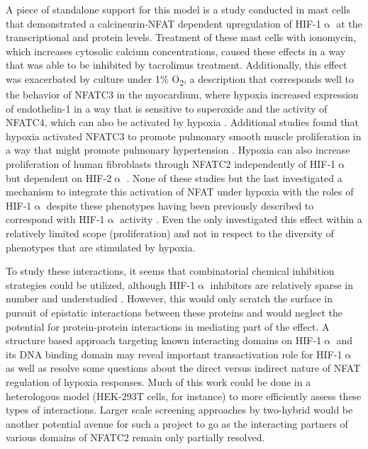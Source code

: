 A piece of standalone support for this model is a study conducted in mast cells that demonstrated a calcineurin-NFAT dependent upregulation of HIF-1$\upalpha$ at the transcriptional and protein levels. Treatment of these mast cells with ionomycin, which increases cytosolic calcium concentrations, caused these effects in a way that was able to be inhibited by tacrolimus treatment. Additionally, this effect was exacerbated by culture under 1\% O\textsubscript{2}, a description that corresponds well to the behavior of NFATC3 in the myocardium, where hypoxia increased expression of endothelin-1 in a way that is sensitive to superoxide and the activity of NFATC4, which can also be activated by hypoxia \citep{deFrutos2011, RamiroDiaz2014, Moreno2015}. Additional studies found that hypoxia activated NFATC3 to promote pulmonary smooth muscle proliferation in a way that might promote pulmonary hypertension \citep{Hou2013}. Hypoxia can also increase proliferation of human fibroblasts through NFATC2 independently of HIF-1$\upalpha$ but dependent on HIF-2$\upalpha$ \citep{Senavirathani2018}. None of these studies but the last investigated a mechanism to integrate this activation of NFAT under hypoxia with the roles of HIF-1$\upalpha$ despite these phenotypes having been previously described to correspond with HIF-1$\upalpha$ activity \citep{Cui2021, Qi2017, Li2014, Thackaberry2002, SonanezOrganis2016}. Even the \citeauthor{Senavirathani2018} only investigated this effect within a relatively limited scope (proliferation) and not in respect to the diversity of phenotypes that are stimulated by hypoxia.

To study these interactions, it seems that combinatorial chemical inhibition strategies could be utilized, although HIF-1$\upalpha$ inhibitors are relatively sparse in number and understudied \citep{Viziteu2016}. However, this would only scratch the surface in pursuit of epistatic interactions between these proteins and would neglect the potential for protein-protein interactions in mediating part of the effect. A structure based approach targeting known interacting domains on HIF-1$\upalpha$ and its DNA binding domain may reveal important transactivation role for HIF-1$\upalpha$ as well as resolve some questions about the direct versus indirect nature of NFAT regulation of hypoxia responses. Much of this work could be done in a heterologous model (HEK-293T cells, for instance) to more efficiently assess these types of interactions. Larger scale screening approaches by two-hybrid would be another potential avenue for such a project to go as the interacting partners of various domains of NFATC2 remain only partially resolved. 

